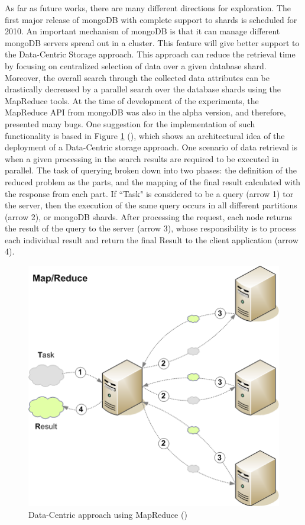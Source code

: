 As far as future works, there are many different directions for exploration.
The first major release of mongoDB with complete support to shards is
scheduled for 2010. An important mechanism of mongoDB is that it can
manage different mongoDB servers spread out in a cluster. This feature will give
better support to the Data-Centric Storage approach. This approach can reduce
the retrieval time by focusing on centralized selection of data over a given
database shard. Moreover, the overall search through the collected data
attributes can be drastically decreased by a parallel search over the database
shards using the MapReduce \cite{map-reduce} tools. At the time of development
of the experiments, the MapReduce API from mongoDB was also in the alpha
version, and therefore, presented many bugs. One suggestion for the
implementation of such functionality is based in Figure
\ref{fig:future-works-data-centric-map-reduce} (\cite{map-reduce-notes}), which
shows an architectural idea of the deployment of a Data-Centric storage approach. One scenario of
data retrieval is when a given processing in the search results are
required to be executed in parallel. The task of querying broken down into
two phases: the definition of the reduced problem as the parts, and the
mapping of the final result calculated with the response from each part. If
``Task" is considered to be a query (arrow 1) tor the server, then the
execution of the same query occurs in all different partitions (arrow 2), or
mongoDB shards. After processing the request, each node returns the result of
the query to the server (arrow 3), whose responsibility is to process each
individual result and return the final Result to the client application (arrow
4).

\begin{figure}[!h]
  \centering
  \includegraphics[scale=0.65]{../diagrams/future-works-data-centric-map-reduce}
  \caption{Data-Centric approach using MapReduce (\cite{map-reduce-notes})}
  \label{fig:future-works-data-centric-map-reduce}
\end{figure}

